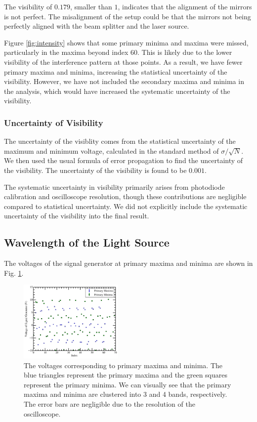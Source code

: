 The visibility of $0.179$, smaller than $1$, indicates that the alignment of the mirrors is not perfect. The misalignment of the setup could be that the mirrors not being perfectly aligned with the beam splitter and the laser source.

Figure \ref{fig:intensity} shows that some primary minima and maxima were missed, particularly in the maxima beyond index 60. This is likely due to the lower visibility of the interference pattern at those points. As a result, we have fewer primary maxima and minima, increasing the statistical uncertainty of the visibility. However, we have not included the secondary maxima and minima in the analysis, which would have increased the systematic uncertainty of the visibility. 


\subsubsection{Uncertainty of Visibility}
The uncertainty of the visiblity comes from the statistical uncertainty of the maximum and minimum voltage, calculated in the standard method of $\sigma/\sqrt{N}$. We then used the usual formula of error propagation to find the uncertainty of the visibility. The uncertainty of the visibility is found to be $0.001$. 

The systematic uncertainty in visibility primarily arises from photodiode calibration and oscilloscope resolution, though these contributions are negligible compared to statistical uncertainty. We did not explicitly include the systematic uncertainty of the visibility into the final result.

\subsection{Wavelength of the Light Source}
The voltages of the signal generator at primary maxima and minima are shown in Fig. \ref{fig:data}. 
\begin{figure}[h]
    \centering
    \includegraphics[width=0.45\textwidth]{fig/Primary_Maxima_Minima.png}
    \caption{The voltages corresponding to primary maxima and minima. The blue triangles represent the primary maxima and the green squares represent the primary minima. We can visually see that the primary maxima and minima are clustered into 3 and 4 bands, respectively. The error bars are negligible due to the resolution of the oscilloscope.}
    \label{fig:data}
\end{figure}

